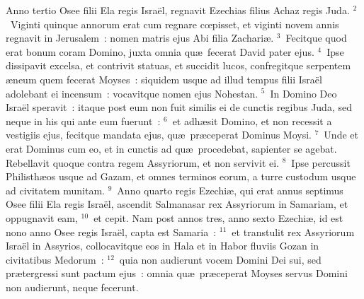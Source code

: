 \lettrine[lines=10,image=true,loversize=0.05,lraise=-0.03]{A}{}nno tertio Osee filii Ela regis Isra\"el, regnavit Ezechias filius Achaz regis Juda.
${}^{2}$~Viginti quinque annorum erat cum regnare cœpisset, et viginti novem annis regnavit in Jerusalem~: nomen matris ejus Abi filia Zachari\ae .
${}^{3}$~Fecitque quod erat bonum coram Domino, juxta omnia qu\ae\ fecerat David pater ejus.
${}^{4}$~Ipse dissipavit excelsa, et contrivit statuas, et succidit lucos, confregitque serpentem \ae neum quem fecerat Moyses~: siquidem usque ad illud tempus filii Isra\"el adolebant ei incensum~: vocavitque nomen ejus Nohestan.
${}^{5}$~In Domino Deo Isra\"el speravit~: itaque post eum non fuit similis ei de cunctis regibus Juda, sed neque in his qui ante eum fuerunt~:
${}^{6}$~et adh\ae sit Domino, et non recessit a vestigiis ejus, fecitque mandata ejus, qu\ae\ pr\ae ceperat Dominus Moysi.
${}^{7}$~Unde et erat Dominus cum eo, et in cunctis ad qu\ae\ procedebat, sapienter se agebat. Rebellavit quoque contra regem Assyriorum, et non servivit ei.
${}^{8}$~Ipse percussit Philisth\ae os usque ad Gazam, et omnes terminos eorum, a turre custodum usque ad civitatem munitam.
${}^{9}$~Anno quarto regis Ezechi\ae , qui erat annus septimus Osee filii Ela regis Isra\"el, ascendit Salmanasar rex Assyriorum in Samariam, et oppugnavit eam,
${}^{10}$~et cepit. Nam post annos tres, anno sexto Ezechi\ae , id est nono anno Osee regis Isra\"el, capta est Samaria~:
${}^{11}$~et transtulit rex Assyriorum Isra\"el in Assyrios, collocavitque eos in Hala et in Habor fluviis Gozan in civitatibus Medorum~:
${}^{12}$~quia non audierunt vocem Domini Dei sui, sed pr\ae tergressi sunt pactum ejus~: omnia qu\ae\ pr\ae ceperat Moyses servus Domini non audierunt, neque fecerunt.


